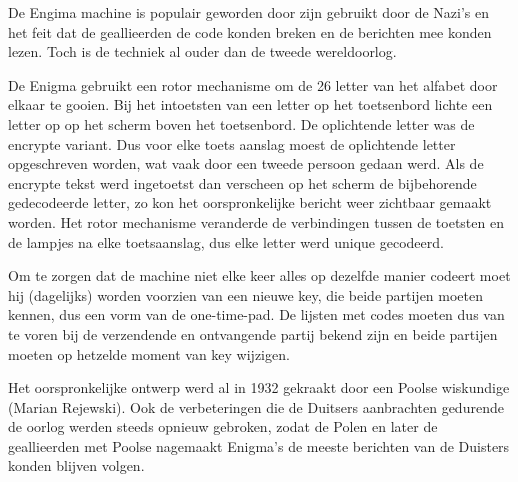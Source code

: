 De Engima machine is populair geworden door zijn gebruikt door de Nazi's en het feit dat de geallieerden de code konden breken en de berichten mee konden lezen. Toch is de techniek al ouder dan de tweede wereldoorlog.

De Enigma gebruikt een rotor mechanisme om de 26 letter van het alfabet door elkaar te gooien. Bij het intoetsten van een letter op het toetsenbord lichte een letter op op het scherm boven het toetsenbord. De oplichtende letter was de encrypte variant. Dus voor elke toets aanslag moest de oplichtende letter opgeschreven worden, wat vaak door een tweede persoon gedaan werd. Als de encrypte tekst werd ingetoetst dan verscheen op het scherm de bijbehorende gedecodeerde letter, zo kon het oorspronkelijke bericht weer zichtbaar gemaakt worden. Het rotor mechanisme veranderde de verbindingen tussen de toetsten en de lampjes na elke toetsaanslag, dus elke letter werd unique gecodeerd.

Om te zorgen dat de machine niet elke keer alles op dezelfde manier codeert moet hij (dagelijks) worden voorzien van een nieuwe key, die beide partijen moeten kennen, dus een vorm van de one-time-pad. De lijsten met codes moeten dus van te voren bij de verzendende en ontvangende partij bekend zijn en beide partijen moeten op hetzelde moment van key wijzigen.

Het oorspronkelijke ontwerp werd al in 1932 gekraakt door een Poolse wiskundige (Marian Rejewski). Ook de verbeteringen die de Duitsers aanbrachten gedurende de oorlog werden steeds opnieuw gebroken, zodat de Polen en later de geallieerden met Poolse nagemaakt Enigma's de meeste berichten van de Duisters konden blijven volgen.
